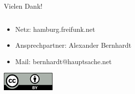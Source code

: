 \documentclass[t]{beamer}
\begin{document}
\begin{frame}{Vielen Dank!}
	\begin{columns}
		\begin{column}{1\textwidth}
			\begin{itemize}
				\item Netz: hamburg.freifunk.net
				\item Ansprechpartner: Alexander Bernhardt 
				\item Mail: bernhardt@hauptsache.net
		\end{itemize}
			\begin{center}
				\includegraphics[width=0.2\textwidth]{Bilder/cc-by}
			\end{center}
		\end{column}
	\end{columns}
\end{frame}
\end{document}
